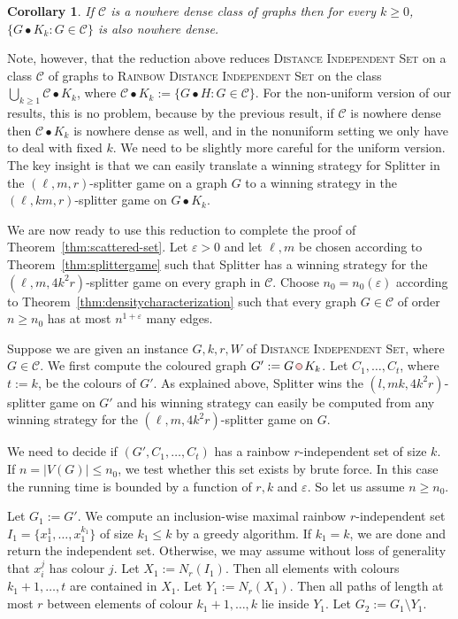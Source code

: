 \documentclass[11pt]{article}
\newtheorem{corollary}[theorem]{Corollary}
\numberwithin{equation}{section}
\newcommand{\st}{\mathrel : }
\newcommand{\CCC}{\mathcal{C}} \newcommand{\DDD}{\mathcal{D}}
\renewcommand{\epsilon}{\varepsilon}
\newcommand{\colprod}{\,\tikz{\path[draw,fill=red!20] circle (2.5pt);}\,}
\begin{document}
\begin{corollary}\label{cor:lexprod}
  If $\CCC$ is a nowhere dense
  class of graphs then for every $k\geq 0$, $\{ G\bullet K_k \st G\in
  \CCC\}$ is also nowhere dense.
\end{corollary}


Note, however, that the reduction above reduces \textsc{Distance
  Independent 
  Set} on a class $\CCC$ of graphs to \textsc{Rainbow
  Distance Independent Set} on the class $\bigcup_{k\ge 1}\CCC\bullet
K_k$, where $\CCC\bullet
K_k:=\{G\bullet H : G\in\CCC\}$. For the non-uniform version of our
results, this is no problem, because by the previous result, if $\CCC$ is nowhere dense then $\CCC\bullet
K_k$ is nowhere dense as well, and in the nonuniform setting we only
have to deal with fixed $k$. We need to be slightly more careful for
the uniform version. The key insight is that we can easily translate a
winning strategy for Splitter in the $(\ell,m,r)$-splitter game on a
graph $G$ to a winning strategy in the $(\ell,km,r)$-splitter game on
$G\bullet K_k$. 


We are now ready to use this reduction to complete the proof of 
Theorem~\ref{thm:scattered-set}.  Let $\epsilon>0$ and let $\ell, m$ be chosen according to Theorem~\ref{thm:splittergame}
  such that Splitter has a winning strategy for the $(\ell,m,
  4k^2r)$-splitter game on every graph in $\CCC$.
 Choose
  $n_0=n_0(\epsilon)$ according to
  Theorem~\ref{thm:densitycharacterization} such that every graph
  $G\in\CCC$ of order $n\geq n_0$ has at most $n^{1+\epsilon}$ many
  edges. 

Suppose we are given an instance $G, k, r, W$ of
\textsc{Distance Independent 
  Set}, where $G\in \CCC$.  We first compute the coloured graph $G' :=
G\colprod K_k$. Let $C_1, \dots, C_t$, where $t := k$,  be the colours of $G'$. As
explained above, Splitter wins the $(l, mk, 4k^2r)$-splitter game on
$G'$ and his winning strategy can easily be computed from
any winning strategy for the $(\ell, m, 4k^2r)$-splitter game on $G$.


We need to 
decide if $(G', C_1, \dots, C_t)$ has a rainbow $r$-independent set of 
  size $k$. If
  $n=|V(G)|\leq n_0$, we test whether this set exists by brute force. In this case the
  running time is bounded by a function of $r,k$ and $\epsilon$. So
  let us assume $n\geq n_0$.

  Let $G_1:=G'$. We compute an inclusion-wise maximal rainbow $r$-independent set
  $I_1=\{x_1^1,\ldots, x_1^{k_1}\}$ of size $k_1\leq k$ by a greedy
  algorithm. If $k_1=k$, we are done and return the independent
  set. Otherwise, we may assume without loss of generality that
  $x_i^j$ has colour $j$. Let $X_1:=N_r(I_1)$. Then all elements
  with colours $k_1+1,\ldots, t$ are contained in $X_1$. Let
  $Y_1:=N_r(X_1)$. Then all paths of length at most $r$ between
  elements of colour $k_1+1,\ldots, k$ lie inside $Y_1$. Let
  $G_2:=G_1\setminus Y_1$.
\end{document}
